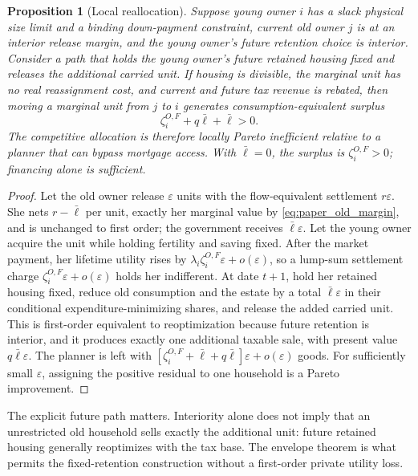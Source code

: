 \documentclass[11pt]{article}
\newtheorem{proposition}{Proposition}
\newcommand{\1}{\mathbf 1}
\newcommand{\ellbar}{\bar\ell}
\begin{document}
\begin{proposition}[Local reallocation]
Suppose young owner $i$ has a slack physical size limit and a binding
down-payment constraint, current old owner $j$ is at an interior release
margin, and the young owner's future retention choice is interior. Consider a
path that holds the young owner's future retained housing fixed and releases
the additional carried unit. If housing is divisible, the marginal unit has no
real reassignment cost, and current and future tax revenue is rebated, then
moving a marginal unit from $j$ to $i$ generates consumption-equivalent surplus
\begin{equation}
\zeta_i^{O,F}+q\ellbar+\ellbar>0.
\label{eq:paper_local_surplus}
\end{equation}
The competitive allocation is therefore locally Pareto inefficient relative
to a planner that can bypass mortgage access. With $\ellbar=0$, the surplus is
$\zeta_i^{O,F}>0$; financing alone is sufficient.
\end{proposition}

\begin{proof}
Let the old owner release $\varepsilon$ units with the flow-equivalent
settlement $r\varepsilon$.
She nets $r-\ellbar$ per unit, exactly her marginal value by
\eqref{eq:paper_old_margin}, and is unchanged to first order; the government
receives $\ellbar\varepsilon$. Let the young owner acquire the unit while
holding fertility and saving fixed. After the market payment, her lifetime
utility rises by
$\lambda_i\zeta_i^{O,F}\varepsilon+o(\varepsilon)$, so a lump-sum settlement
charge $\zeta_i^{O,F}\varepsilon+o(\varepsilon)$ holds her indifferent. At
date $t+1$, hold her retained housing fixed, reduce old consumption and the
estate by a total $\ellbar\varepsilon$ in their conditional
expenditure-minimizing shares, and release the added carried unit. This is
first-order equivalent to reoptimization because future retention is interior,
and it produces exactly one additional taxable sale, with present value
$q\ellbar\varepsilon$. The planner is left with
$[\zeta_i^{O,F}+\ellbar+q\ellbar]\varepsilon+o(\varepsilon)$ goods. For
sufficiently small $\varepsilon$, assigning the positive residual to one
household is a Pareto improvement.
\end{proof}

The explicit future path matters. Interiority alone does not imply that an
unrestricted old household sells exactly the additional unit: future retained
housing generally reoptimizes with the tax base. The envelope theorem is what
permits the fixed-retention construction without a first-order private utility
loss.
\end{document}
